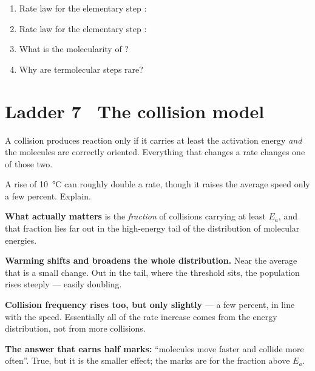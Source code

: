 \documentclass{apchem-worksheet}
\begin{document}
\begin{yourturn}
\begin{enumerate}[leftmargin=*,itemsep=0.5em]
  \item Rate law for the elementary step :
        \workspace[1.4cm]
  \item Rate law for the elementary step :
        \workspace[1.4cm]
  \item What is the molecularity of ?
        \workspace[1.4cm]
  \item Why are termolecular steps rare? \workspace[1.6cm]
\end{enumerate}
\end{yourturn}

\section*{\sffamily Ladder 7 \textbullet\ The collision model}

A collision produces reaction only if it carries at least the activation
energy \emph{and} the molecules are correctly oriented. Everything that
changes a rate changes one of those two.

\begin{workedexample}
A rise of \SI{10}{\celsius} can roughly double a rate, though it raises
the average speed only a few percent. Explain.

\textbf{What actually matters} is the \emph{fraction} of collisions
carrying at least $E_a$, and that fraction lies far out in the
high-energy tail of the distribution of molecular energies.

\textbf{Warming shifts and broadens the whole distribution.} Near the
average that is a small change. Out in the tail, where the threshold sits,
the population rises steeply --- easily doubling.

\textbf{Collision frequency rises too, but only slightly} --- a few
percent, in line with the speed. Essentially all of the rate increase
comes from the energy distribution, not from more collisions.

\textbf{The answer that earns half marks:} ``molecules move faster and
collide more often''. True, but it is the smaller effect; the marks are
for the fraction above $E_a$.
\end{workedexample}
\end{document}
